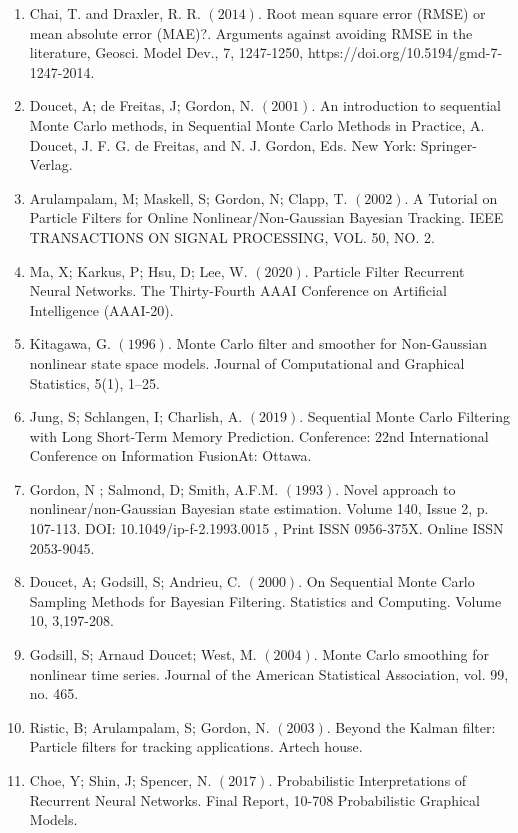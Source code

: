 \documentclass[runningheads]{llncs}
\begin{document}
\begin{enumerate}
\item Chai, T. and Draxler, R. R. $(2014)$. Root mean square error (RMSE) or mean absolute error (MAE)?. 
 Arguments against avoiding RMSE in the literature, Geosci. Model Dev., 7, 1247-1250,
  https://doi.org/10.5194/gmd-7-1247-2014.
  \item  Doucet, A; de Freitas, J;  Gordon, N. $(2001)$. An introduction to
sequential Monte Carlo methods, in Sequential Monte Carlo Methods
in Practice, A. Doucet, J. F. G. de Freitas, and N. J. Gordon, Eds. New
York: Springer-Verlag.
\item Arulampalam, M; Maskell, S;  Gordon, N;  Clapp, T. $(2002)$.
A Tutorial on Particle Filters for Online
Nonlinear/Non-Gaussian Bayesian Tracking.
IEEE TRANSACTIONS ON SIGNAL PROCESSING, VOL. 50, NO. 2.
\item Ma, X; Karkus, P;  Hsu, D; Lee, W. $(2020)$.
Particle Filter Recurrent Neural Networks.
The Thirty-Fourth AAAI Conference on Artificial Intelligence (AAAI-20).
 \item Kitagawa, G. $(1996)$. Monte Carlo filter and smoother for Non-Gaussian 
 nonlinear state space models. Journal of Computational and Graphical Statistics,
 5(1), 1–25.
 \item Jung, S;  Schlangen, I; Charlish, A. $(2019)$.
 Sequential Monte Carlo Filtering with Long
 Short-Term Memory Prediction. Conference: 22nd International
 Conference on Information FusionAt: Ottawa.
 \item  Gordon, N ; Salmond, D; Smith, A.F.M. $(1993)$.
 Novel approach to nonlinear/non-Gaussian Bayesian state estimation.
 Volume 140, Issue 2, p. 107-113.
 DOI:  10.1049/ip-f-2.1993.0015 , Print ISSN 0956-375X. 
 Online ISSN 2053-9045.
 \item Doucet, A; Godsill, S;  Andrieu, C. $(2000)$.
 On Sequential Monte Carlo Sampling Methods for Bayesian Filtering.
 Statistics and Computing. Volume 10, 3,197-208.
 \item Godsill, S; Arnaud Doucet; West, M. $(2004)$.
 Monte Carlo smoothing for nonlinear time series.
 Journal of the American Statistical Association, vol. 99, no. 465.
 \item  Ristic, B; Arulampalam, S;  Gordon, N. $(2003)$. Beyond the Kalman filter:
 Particle filters for tracking applications. Artech house.
  \item Choe, Y;  Shin, J;  Spencer, N. $(2017)$.
  Probabilistic Interpretations of Recurrent Neural Networks.
  Final Report, 10-708 Probabilistic Graphical Models.

\end{enumerate}
\end{document}
